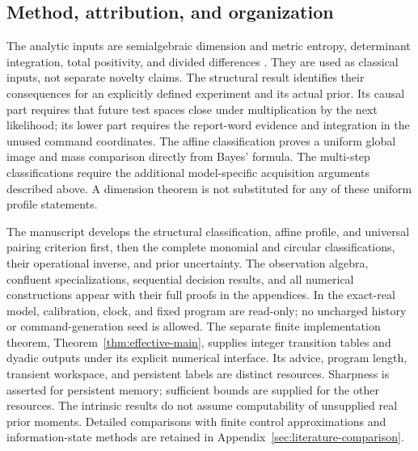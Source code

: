 \subsection{Method, attribution, and organization}
The analytic inputs are semialgebraic dimension and metric entropy,
determinant integration, total positivity, and divided differences
\cite{BochnakCosteRoy,ForresterAndreief,Pinkus,deBoor,
YomdinComte,ZhangKileel,ComteHalupczok}. They are used as classical
inputs, not separate novelty claims. The structural result identifies
their consequences for an explicitly defined experiment and its actual
prior. Its causal part requires that future test spaces close under
multiplication by the next likelihood; its lower part requires the
report-word evidence and integration in the unused command coordinates.
The affine classification proves a uniform global image and mass
comparison directly from Bayes' formula. The multi-step classifications
require the additional model-specific acquisition arguments described
above. A dimension theorem is not substituted for any of these uniform
profile statements.

The manuscript develops the structural classification, affine profile,
and universal pairing criterion first, then the complete monomial and
circular classifications, their operational inverse, and prior
uncertainty. The observation algebra, confluent specializations,
sequential decision results, and all numerical constructions appear
with their full proofs in the appendices. In the exact-real model,
calibration, clock, and fixed program are read-only; no uncharged
history or command-generation seed is allowed. The separate finite
implementation theorem, Theorem~\ref{thm:effective-main}, supplies
integer transition tables and dyadic outputs under its explicit
numerical interface. Its advice, program length, transient workspace,
and persistent labels are distinct resources. Sharpness is asserted
for persistent memory; sufficient bounds are supplied for the other
resources. The intrinsic results do not assume computability of
unsupplied real prior moments. Detailed comparisons with finite
control approximations and information-state methods are retained in
Appendix~\ref{sec:literature-comparison}.
